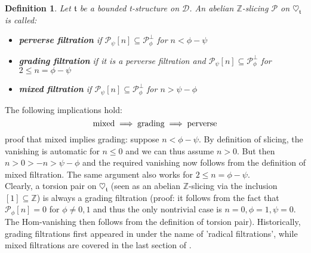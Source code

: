 \documentclass{article}
\newtheorem{defn}[thm]{Definition}
\theoremstyle{definition}
\begin{document}
%
%

\begin{defn}
Let $\mathfrak{t}$ be a bounded t-structure on $\mathscr{D}$. An abelian $\mathbb{Z}$-slicing $\mathscr{P}$ on $\heartsuit_{\mathfrak{t}}$ is called:
\begin{itemize}
\item \textbf{perverse filtration} if $\mathscr{P}_{\psi}[n] \subseteq \mathscr{P}_{\phi}^{\perp}$ for $n < \phi - \psi$
\item \textbf{grading filtration} if it is a perverse filtration and $\mathscr{P}_{\psi}[n] \subseteq \mathscr{P}_{\phi }^{\perp}$ for $2 \le n = \phi - \psi$ 
\item \textbf{mixed filtration} if $\mathscr{P}_{\psi}[n] \subseteq \mathscr{P}_{\phi }^{\perp}$ for $n > \psi - \phi$ 
\end{itemize} 
\end{defn}

The following implications hold: 
$$\textnormal{mixed} \implies \textnormal{grading} \implies \textnormal{perverse} $$
{\color{red}proof that mixed implies grading: suppose $n< \phi - \psi$. By definition of slicing, the vanishing is automatic for $n \le 0$ and we can thus assume $n>0$. But then $n>0>-n>\psi-\phi$ and the required vanishing now follows from the definition of mixed filtration. The same argument also works for $2 \le n = \phi - \psi$}. \\
Clearly, a torsion pair on $\heartsuit_{\mathfrak{t}}$ (seen as an abelian $\mathbb{Z}$-slicing via the inclusion $[1] \subseteq \mathbb{Z}$) is always a grading filtration {\color{red}(proof: it follows from the fact that $\mathscr{P}_{\phi}[n]=0$ for $\phi \not = 0,1$ and thus the only nontrivial case is $n=0, \phi=1, \psi=0$. The Hom-vanishing then follows from the definition of torsion pair)}. Historically, grading filtrations first appeared in \cite{ekh} under the name of 'radical filtrations', while mixed filtrations are covered in the last section of \cite{kos}.
\end{document}
